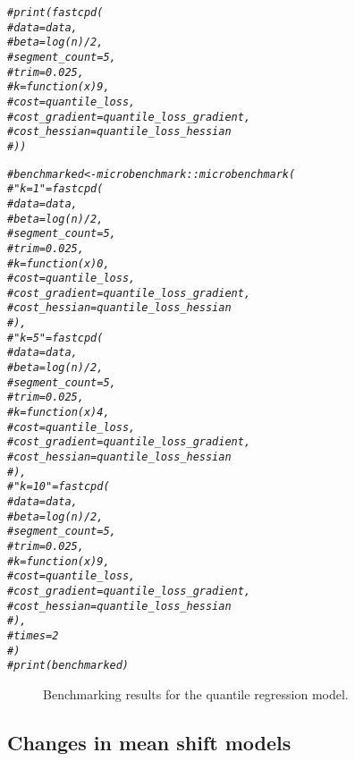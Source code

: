 \documentclass[article]{jss}\usepackage[]{graphicx}\usepackage[]{xcolor}
\makeatletter
\newcommand{\hlcom}[1]{\textcolor[rgb]{0.678,0.584,0.686}{\textit{#1}}}%
\newenvironment{kframe}{%
 \def\at@end@of@kframe{}%
 \ifinner\ifhmode%
  \def\at@end@of@kframe{\end{minipage}}%
  \begin{minipage}{\columnwidth}%
 \fi\fi%
 \def\FrameCommand##1{\hskip\@totalleftmargin \hskip-\fboxsep
 \colorbox{shadecolor}{##1}\hskip-\fboxsep
     \hskip-\linewidth \hskip-\@totalleftmargin \hskip\columnwidth}%
 \MakeFramed {\advance\hsize-\width
   \@totalleftmargin\z@ \linewidth\hsize
   \@setminipage}}%
 {\par\unskip\endMakeFramed%
 \at@end@of@kframe}
\newenvironment{knitrout}{}{} %
\makeatother
\begin{document}
\begin{knitrout}
\begin{kframe}
\begin{alltt}
\hlcom{# print(fastcpd(}
\hlcom{#   data = data,}
\hlcom{#   beta = log(n) / 2,}
\hlcom{#   segment_count = 5,}
\hlcom{#   trim = 0.025,}
\hlcom{#   k = function(x) 9,}
\hlcom{#   cost = quantile_loss,}
\hlcom{#   cost_gradient = quantile_loss_gradient,}
\hlcom{#   cost_hessian = quantile_loss_hessian}
\hlcom{# ))}

\hlcom{# benchmarked <- microbenchmark::microbenchmark(}
\hlcom{#   "k = 1" = fastcpd(}
\hlcom{#     data = data,}
\hlcom{#     beta = log(n) / 2,}
\hlcom{#     segment_count = 5,}
\hlcom{#     trim = 0.025,}
\hlcom{#     k = function(x) 0,}
\hlcom{#     cost = quantile_loss,}
\hlcom{#     cost_gradient = quantile_loss_gradient,}
\hlcom{#     cost_hessian = quantile_loss_hessian}
\hlcom{#   ),}
\hlcom{#   "k = 5" = fastcpd(}
\hlcom{#     data = data,}
\hlcom{#     beta = log(n) / 2,}
\hlcom{#     segment_count = 5,}
\hlcom{#     trim = 0.025,}
\hlcom{#     k = function(x) 4,}
\hlcom{#     cost = quantile_loss,}
\hlcom{#     cost_gradient = quantile_loss_gradient,}
\hlcom{#     cost_hessian = quantile_loss_hessian}
\hlcom{#   ),}
\hlcom{#   "k = 10" = fastcpd(}
\hlcom{#     data = data,}
\hlcom{#     beta = log(n) / 2,}
\hlcom{#     segment_count = 5,}
\hlcom{#     trim = 0.025,}
\hlcom{#     k = function(x) 9,}
\hlcom{#     cost = quantile_loss,}
\hlcom{#     cost_gradient = quantile_loss_gradient,}
\hlcom{#     cost_hessian = quantile_loss_hessian}
\hlcom{#   ),}
\hlcom{#   times = 2}
\hlcom{# )}
\hlcom{# print(benchmarked)}
\end{alltt}
\end{kframe}
\end{knitrout}
%

\begin{figure}[t!]
\centering
\caption{\label{fig:quantile regression bench mark} Benchmarking results for
the quantile regression model.}
\end{figure}

\subsection{Changes in mean shift models} \label{sec:mean shift model}
\end{document}
